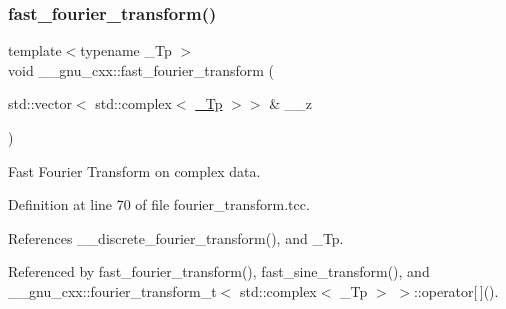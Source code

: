 \subsubsection{\texorpdfstring{fast\+\_\+fourier\+\_\+transform()}{fast\_fourier\_transform()}\hspace{0.1cm}{\footnotesize\ttfamily [1/3]}}
{\footnotesize\ttfamily template$<$typename \+\_\+\+Tp $>$ \\
void \+\_\+\+\_\+gnu\+\_\+cxx\+::fast\+\_\+fourier\+\_\+transform (\begin{DoxyParamCaption}\item[{std\+::vector$<$ std\+::complex$<$ \hyperlink{namespace____gnu__cxx_a3b19a9c800ca194374ef9172290f7d79}{\+\_\+\+Tp} $>$$>$ \&}]{\+\_\+\+\_\+z }\end{DoxyParamCaption})}

Fast Fourier Transform on complex data. 

Definition at line 70 of file fourier\+\_\+transform.\+tcc.



References \+\_\+\+\_\+discrete\+\_\+fourier\+\_\+transform(), and \+\_\+\+Tp.



Referenced by fast\+\_\+fourier\+\_\+transform(), fast\+\_\+sine\+\_\+transform(), and \+\_\+\+\_\+gnu\+\_\+cxx\+::fourier\+\_\+transform\+\_\+t$<$ std\+::complex$<$ \+\_\+\+Tp $>$ $>$\+::operator\mbox{[}$\,$\mbox{]}().


